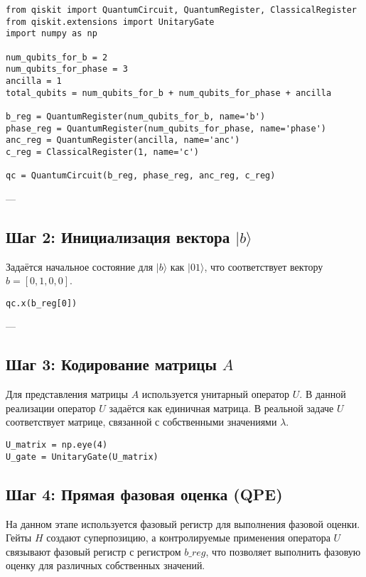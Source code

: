 \begin{verbatim}
from qiskit import QuantumCircuit, QuantumRegister, ClassicalRegister
from qiskit.extensions import UnitaryGate
import numpy as np

num_qubits_for_b = 2
num_qubits_for_phase = 3  
ancilla = 1
total_qubits = num_qubits_for_b + num_qubits_for_phase + ancilla

b_reg = QuantumRegister(num_qubits_for_b, name='b')
phase_reg = QuantumRegister(num_qubits_for_phase, name='phase')
anc_reg = QuantumRegister(ancilla, name='anc')
c_reg = ClassicalRegister(1, name='c')

qc = QuantumCircuit(b_reg, phase_reg, anc_reg, c_reg)
\end{verbatim}

---

\subsection*{Шаг 2: Инициализация вектора \( |b\rangle \)}

Задаётся начальное состояние для \( |b\rangle \) как \( |01\rangle \), что соответствует вектору \( b = [0, 1, 0, 0] \).

\begin{verbatim}
qc.x(b_reg[0])
\end{verbatim}

---

\subsection*{Шаг 3: Кодирование матрицы \( A \)}

Для представления матрицы \( A \) используется унитарный оператор \( U \). В данной реализации оператор \( U \) задаётся как единичная матрица. В реальной задаче \( U \) соответствует матрице, связанной с собственными значениями \( \lambda \).

\begin{verbatim}
U_matrix = np.eye(4)
U_gate = UnitaryGate(U_matrix)
\end{verbatim}



\subsection*{Шаг 4: Прямая фазовая оценка (QPE)}

На данном этапе используется фазовый регистр для выполнения фазовой оценки. Гейты \( H \) создают суперпозицию, а контролируемые применения оператора \( U \) связывают фазовый регистр с регистром \( b\_reg \), что позволяет выполнить фазовую оценку для различных собственных значений.

